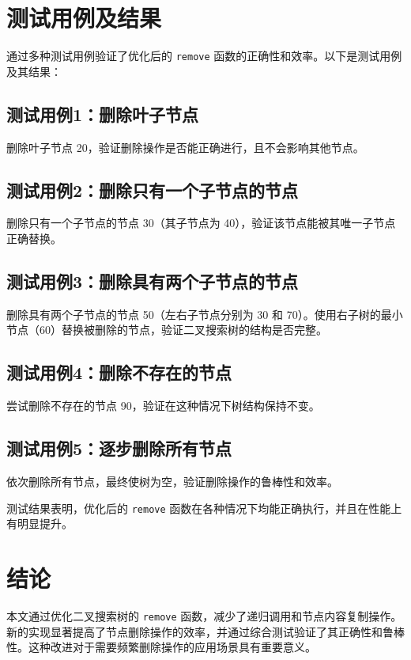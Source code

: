 \documentclass[Unicode]{ctexart}
\begin{document}
\section{测试用例及结果}

通过多种测试用例验证了优化后的 \texttt{remove} 函数的正确性和效率。以下是测试用例及其结果：

\subsection{测试用例1：删除叶子节点}
删除叶子节点 20，验证删除操作是否能正确进行，且不会影响其他节点。

\subsection{测试用例2：删除只有一个子节点的节点}
删除只有一个子节点的节点 30（其子节点为 40），验证该节点能被其唯一子节点正确替换。

\subsection{测试用例3：删除具有两个子节点的节点}
删除具有两个子节点的节点 50（左右子节点分别为 30 和 70）。使用右子树的最小节点（60）替换被删除的节点，验证二叉搜索树的结构是否完整。

\subsection{测试用例4：删除不存在的节点}
尝试删除不存在的节点 90，验证在这种情况下树结构保持不变。

\subsection{测试用例5：逐步删除所有节点}
依次删除所有节点，最终使树为空，验证删除操作的鲁棒性和效率。

测试结果表明，优化后的 \texttt{remove} 函数在各种情况下均能正确执行，并且在性能上有明显提升。

\section{结论}
本文通过优化二叉搜索树的 \texttt{remove} 函数，减少了递归调用和节点内容复制操作。新的实现显著提高了节点删除操作的效率，并通过综合测试验证了其正确性和鲁棒性。这种改进对于需要频繁删除操作的应用场景具有重要意义。
\end{document}
